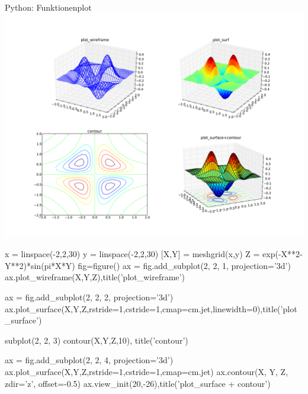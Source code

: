\documentclass[hyperref={xetex}]{beamer}
\begin{document}
% 
% 
\begin{frame}[fragile]{Python: Funktionenplot}
\hfil\includegraphics[width=1\textwidth]{figures/function_plot3d_py}\hfil
\end{frame}

% 
% 
\begin{frame}[fragile]{}
  \begin{pyin}
x = linspace(-2,2,30)
y = linspace(-2,2,30)
[X,Y] = meshgrid(x,y)
Z = exp(-X**2-Y**2)*sin(pi*X*Y)
fig=figure()
ax = fig.add_subplot(2, 2, 1, projection='3d')
ax.plot_wireframe(X,Y,Z),title('plot_wireframe')

ax = fig.add_subplot(2, 2, 2, projection='3d')
ax.plot_surface(X,Y,Z,rstride=1,cstride=1,cmap=cm.jet,linewidth=0),title('plot_surface')

subplot(2, 2, 3)
contour(X,Y,Z,10), title('contour')

ax = fig.add_subplot(2, 2, 4, projection='3d') 
ax.plot_surface(X,Y,Z,rstride=1,cstride=1,cmap=cm.jet)
ax.contour(X, Y, Z, zdir='z', offset=-0.5)
ax.view_init(20,-26),title('plot_surface + contour')    
  \end{pyin}
\end{frame}
\end{document}
